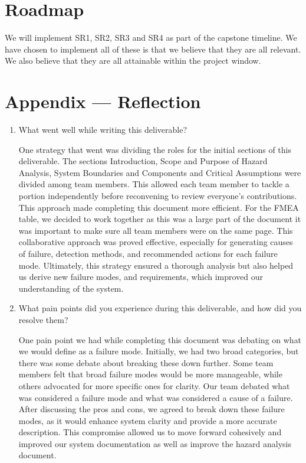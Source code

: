 \documentclass{article}
\begin{document}
\section{Roadmap}

We will implement SR1, SR2, SR3 and SR4 as part of the capstone timeline.
We have chosen to implement all of these is that we believe that they are all relevant.
We also believe that they are all attainable within the project window.

\newpage{}

\section*{Appendix --- Reflection}



\begin{enumerate}
    \item What went well while writing this deliverable?
    
    One strategy that went was dividing the roles for the initial sections of this deliverable. 
    The sections Introduction, Scope and Purpose of Hazard Analysis, System Boundaries and Components and Critical Assumptions were divided among team members.
    This allowed each team member to tackle a portion independently before reconvening to review everyone’s contributions.  
    This approach made completing this document more efficient. 
    For the FMEA table, we decided to work together as this was a large part of the document it was important to make sure all team members were on the same page. 
    This collaborative approach was proved effective, especially for generating causes of failure, detection methods, and recommended actions for each failure mode.
    Ultimately, this strategy ensured a thorough analysis but also helped us derive new failure modes, and requirements, which improved our understanding of the system.
    
    \item What pain points did you experience during this deliverable, and how
    did you resolve them?
    
    One pain point we had while completing this document was debating on what we would define as a failure mode. 
    Initially, we had two broad categories, but there was some debate about breaking these down further. 
    Some team members felt that broad failure modes would be more manageable, while others advocated for more specific ones for clarity. 
    Our team debated what was considered a failure mode and what was considered a cause of a failure. 
    After discussing the pros and cons, we agreed to break down these failure modes, as it would enhance system clarity and provide a more accurate description. 
    This compromise allowed us to move forward cohesively and improved our system documentation as well as improve the hazard analysis document.
    

\end{enumerate}
\end{document}
